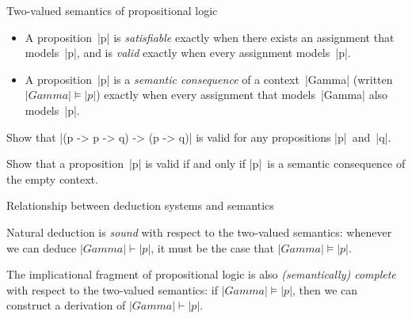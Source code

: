 \documentclass[t,compress,hyperref={hidelinks}]{beamer}
\begin{document}
\begin{frame}{Two-valued semantics of propositional logic}

\begin{itemize}

\item A proposition~|p| is \emph{satisfiable} exactly when there exists an assignment that models~|p|, and is \emph{valid} exactly when every assignment models~|p|.

\item A proposition~|p| is a \emph{semantic consequence} of a context~|Gamma| (written $|Gamma| \models |p|$) exactly when every assignment that models~|Gamma| also models~|p|.

\end{itemize}

 Show that |(p -> p -> q) -> (p -> q)| is valid for any propositions |p|~and~|q|.

 Show that a proposition~|p| is valid if and only if |p|~is a semantic consequence of the empty context.

\end{frame}

\begin{frame}{Relationship between deduction systems and semantics}

Natural deduction is \emph{sound} with respect to the two-valued semantics: whenever we can deduce $|Gamma| \vdash |p|$, it must be the case that $|Gamma| \models |p|$.

The implicational fragment of propositional logic is also \emph{(semantically) complete} with respect to the two-valued semantics: if $|Gamma| \models |p|$, then we can construct a derivation of $|Gamma| \vdash |p|$.

\end{frame}
\end{document}
